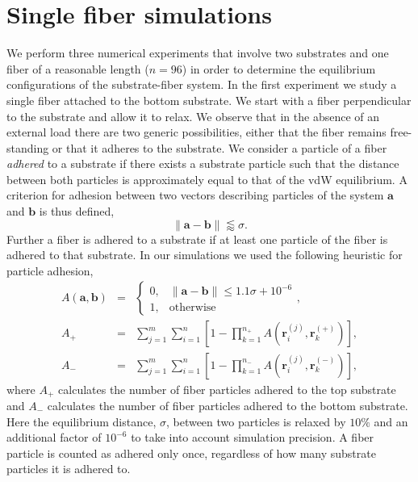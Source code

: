 \chapter{Single fiber simulations} \label{chap:three}

We perform three numerical experiments that involve two substrates and one fiber of a reasonable length ($n=96$) in order to determine the equilibrium configurations of the substrate-fiber system. In the first experiment we study a single fiber attached to the bottom substrate. We start with a fiber perpendicular to the substrate and allow it to relax. We observe that in the absence of an external load there are two generic possibilities, either that the fiber remains free-standing or that it adheres to the substrate. We consider a particle of a fiber \textit{adhered} to a substrate if there exists a substrate particle such that the distance between both particles is approximately equal to that of the vdW equilibrium. A criterion for adhesion between two vectors describing particles of the system $\textbf{a}$ and $\textbf{b}$ is thus defined, 
\begin{equation} \label{eqn:criterion}
	\|\textbf{a} - \textbf{b}\| \lessapprox \sigma.
\end{equation}
Further a fiber is adhered to a substrate if at least one particle of the fiber is adhered to that substrate. In our simulations we used the following heuristic for particle adhesion, 
\begin{eqnarray} \label{eqn:adhesion}
	A(\textbf{a}, \textbf{b}) &=& \left\{ 
		\begin{array}{ll}
			0, & \|\textbf{a} - \textbf{b}\| \leq 1.1 \sigma + 10^{-6}\\
			1, & \mbox{otherwise}
		\end{array}
		\right. ,  \\
	A_+ &=& \sum_{j=1}^{m} \sum_{i=1}^{n} \left[ 1 - \prod_{k=1}^{n_+} A(\textbf{r}_i^{(j)},\textbf{r}_k^{(+)}) \right], \label{eqn:adhesion:top} \\ 
	A_- &=& \sum_{j=1}^{m} \sum_{i=1}^{n} \left[ 1 - \prod_{k=1}^{n_-} A(\textbf{r}_i^{(j)},\textbf{r}_k^{(-)}) \right], \label{eqn:adhesion:bottom}
\end{eqnarray}
where $A_+$ calculates the number of fiber particles adhered to the top substrate and $A_-$ calculates the number of fiber particles adhered to the bottom substrate.
Here the equilibrium distance, $\sigma$, between two particles is relaxed by $10\%$ and an additional factor of $10^{-6}$ to take into account simulation precision.
A fiber particle is counted as adhered only once, regardless of how many substrate particles it is adhered to.

